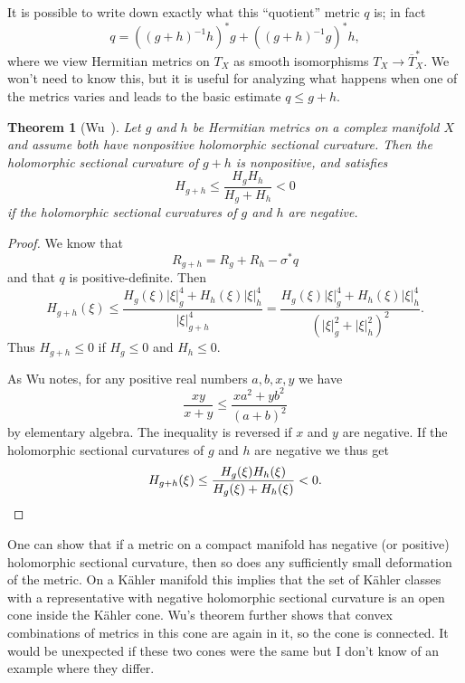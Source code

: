 \documentclass[10pt,a4paper]{amsart}
\newtheorem{theo}{Theorem}
\def\ov#1{\overline{#1}}
\begin{document}
It is possible to write down exactly what this ``quotient'' metric $q$ is; in fact
\[
q = ((g+h)^{-1}h)^*g
+ ((g+h)^{-1}g)^*h,
\]
where we view Hermitian metrics on $T_X$ as smooth isomorphisms $T_X \to
\ov{T}^*_X$. We won't need to know this, but it is useful for analyzing what
happens when one of the metrics varies and leads to the basic estimate $q \leq g
+ h$.



\begin{theo}[Wu~\cite{wu1973remark}]
Let $g$ and $h$ be Hermitian metrics on a complex manifold $X$ and assume both
have nonpositive holomorphic sectional curvature.
Then the holomorphic sectional curvature of $g + h$ is nonpositive, and satisfies
\[
H_{g + h} \leq \frac{H_g H_h}{H_g + H_h} < 0
\]
if the holomorphic sectional curvatures of $g$ and $h$ are negative.
\end{theo}

\begin{proof}
We know that
\[
R_{g + h} = R_g + R_h - \sigma^* q
\]
and that $q$ is positive-definite.
Then
\[
H_{g+h}(\xi)
\leq \frac{H_g(\xi) |\xi|^4_g + H_h(\xi) |\xi|^4_h}{|\xi|^4_{g + h}}
= \frac{H_g(\xi) |\xi|^4_g + H_h(\xi) |\xi|^4_h}{(|\xi|^2_{g} + |\xi|^2_h)^2}.
\]
Thus $H_{g + h} \leq 0$ if $H_g \leq 0$ and $H_h \leq 0$.

As Wu notes,
for any positive real numbers $a, b, x, y$ we have
\[
\frac{xy}{x + y} \leq \frac{x a^2 + y b^2}{(a + b)^2}
\]
by elementary algebra.
The inequality is reversed if $x$ and $y$ are negative.
If the holomorphic sectional curvatures of $g$ and $h$ are negative we thus get
\[
H_{g + h}(\xi) \leq \frac{H_g(\xi) H_h(\xi)}{H_g(\xi) + H_h(\xi)} < 0.
\qedhere
\]
\end{proof}


One can show that if a metric on a compact manifold has negative (or positive)
holomorphic sectional curvature, then so does any sufficiently small
deformation of the metric.
On a K\"ahler manifold this implies that the set of K\"ahler classes with a
representative with negative holomorphic sectional curvature is an open cone
inside the K\"ahler cone.
Wu's theorem further shows that convex combinations of metrics in this cone are
again in it, so the cone is connected.
It would be unexpected if these two cones were the same but I don't know of an
example where they differ.





\end{document}
